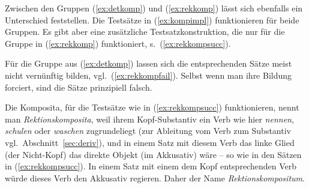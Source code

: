 \begin{exe}
  \ex\label{ex:kompimplfail}
  \begin{xlist}
  \end{xlist}
\end{exe}

Zwischen den Gruppen (\ref{ex:detkomp}) und (\ref{ex:rekkomp}) lässt sich ebenfalls ein Unterschied feststellen.
Die Testsätze in (\ref{ex:kompimpl}) funktionieren für beide Gruppen.
Es gibt aber eine zusätzliche Testsatzkonstruktion, die nur für die Gruppe in (\ref{ex:rekkomp}) funktioniert, s.\ (\ref{ex:rekkompsucc}).

\begin{exe}
  \ex\label{ex:rekkompsucc}
  \begin{xlist}
  \end{xlist}
\end{exe}

Für die Gruppe aus (\ref{ex:detkomp}) lassen sich die entsprechenden Sätze meist nicht vernünftig bilden, vgl.\ (\ref{ex:rekkompfail}).
Selbst wenn man ihre Bildung forciert, sind die Sätze prinzipiell falsch.


\begin{exe}
  \ex\label{ex:rekkompfail}
  \begin{xlist}
  \end{xlist}
\end{exe}

Die Komposita, für die Testsätze wie in (\ref{ex:rekkompsucc}) funktionieren, nennt man \textit{Rektionskomposita}, weil ihrem Kopf-Substantiv ein Verb wie hier \textit{nennen}, \textit{schulen} oder \textit{waschen} zugrundeliegt (zur Ableitung vom Verb zum Substantiv vgl.\ Abschnitt~\ref{sec:deriv}), und in einem Satz mit diesem Verb das linke Glied (der Nicht-Kopf) das direkte Objekt (im Akkusativ) wäre -- so wie in den Sätzen in (\ref{ex:rekkompsucc}).
In einem Satz mit einem dem Kopf entsprechenden Verb würde dieses Verb den Akkusativ regieren. 
Daher der Name \textit{Rektionskompositum}.

